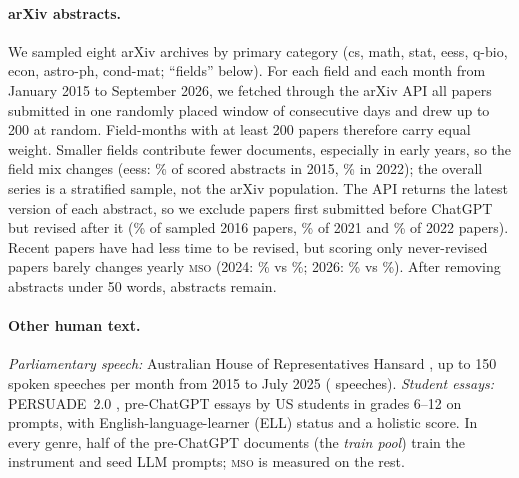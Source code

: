 \documentclass[11pt]{article}
\newcommand{\mso}{\textsc{mso}}
\begin{document}
\paragraph{arXiv abstracts.}
We sampled eight arXiv archives by primary category (cs, math, stat, eess, q-bio, econ, astro-ph, cond-mat; ``fields'' below). For each field and each month from January 2015 to September 2026, we fetched through the arXiv API all papers submitted in one randomly placed window of consecutive days and drew up to 200 at random. Field-months with at least 200 papers therefore carry equal weight. Smaller fields contribute fewer documents, especially in early years, so the field mix changes (eess: \% of scored abstracts in 2015, \% in 2022); the overall series is a stratified sample, not the arXiv population. The API returns the latest version of each
abstract, so we exclude papers first submitted before ChatGPT but revised after it
(\% of sampled 2016 papers,
\% of 2021 and \% of 2022
papers). Recent papers have had less time to be revised, but scoring only never-revised papers barely changes yearly \mso{} (2024: \% vs \%; 2026: \% vs
\%). After removing abstracts under 50 words,
 abstracts remain.

\paragraph{Other human text.}
\emph{Parliamentary speech:} Australian House of Representatives Hansard \citep{katz2023scidata,
katz2025hansard}, up to 150 spoken speeches per month from 2015 to July 2025 (
speeches). \emph{Student essays:} PERSUADE~2.0 \citep{crossley2024persuade}, 
pre-ChatGPT essays by US students in grades 6--12 on  prompts, with
English-language-learner (ELL) status and a holistic score. In every genre, half of the pre-ChatGPT documents (the
\emph{train pool}) train the instrument and seed LLM prompts; \mso{} is measured on the rest.
\end{document}

